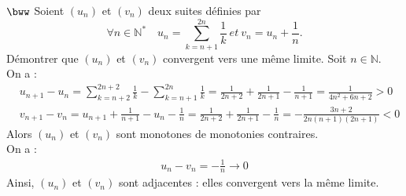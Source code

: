 \documentclass[11pt]{article}
\begin{document}
\begin{exercice}{$\bww$}{}
    Soient $(u_n)$ et $(v_n)$ deux suites définies par
    \begin{equation*}
        \forall n \in \mathbb{N}^* \quad u_n = \sum_{k=n+1}^{2n}\frac{1}{k} ~ et ~ v_n = u_n + \frac{1}{n}.
    \end{equation*}
    Démontrer que $(u_n)$ et $(v_n)$ convergent vers une même limite.
    \tcblower
    Soit $n\in\mathbb{N}$.\\
    On a :
    \begin{align*}
        &u_{n+1} - u_n = \sum_{k=n+2}^{2n+2}\frac{1}{k} - \sum_{k=n+1}^{2n}\frac{1}{k}=\frac{1}{2n+2} + \frac{1}{2n+1} - \frac{1}{n+1} = \frac{1}{4n^2 + 6n + 2} > 0\\
        &v_{n+1} - v_n = u_{n+1} + \frac{1}{n+1} - u_{n} - \frac{1}{n} = \frac{1}{2n+2} + \frac{1}{2n+1} - \frac{1}{n} = -\frac{3n+2}{2n(n+1)(2n+1)}<0
    \end{align*}
    Alors $(u_n)$ et $(v_n)$ sont monotones de monotonies contraires.\\
    On a :
    \begin{align*}
        u_n - v_n = -\frac{1}{n} \longrightarrow 0
    \end{align*}
    Ainsi, $(u_n)$ et $(v_n)$ sont adjacentes : elles convergent vers la même limite.
\end{exercice}
\end{document}

